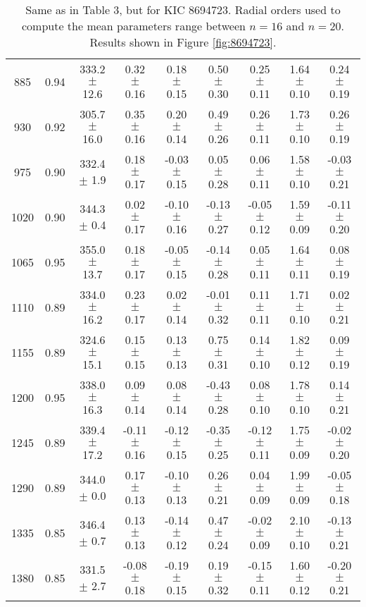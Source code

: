 \documentclass[twocolumn]{aastex61}%
\begin{document}
\begin{table*}[ht]
\begin{tabular}{ccc|ccccc|c}
885 & 0.94 & 333.2 $\pm$ 12.6 & 0.32 $\pm$ 0.16 & 0.18 $\pm$ 0.15 & 0.50 $\pm$ 0.30 & 0.25 $\pm$ 0.11 & 1.64 $\pm$ 0.10 & 0.24 $\pm$ 0.19\\
930 & 0.92 & 305.7 $\pm$ 16.0 & 0.35 $\pm$ 0.16 & 0.20 $\pm$ 0.14 & 0.49 $\pm$ 0.26 & 0.26 $\pm$ 0.11 & 1.73 $\pm$ 0.10 & 0.26 $\pm$ 0.19\\
975 & 0.90 & 332.4 $\pm$ 1.9 & 0.18 $\pm$ 0.17 & -0.03 $\pm$ 0.15 & 0.05 $\pm$ 0.28 & 0.06 $\pm$ 0.11 & 1.58 $\pm$ 0.10 & -0.03 $\pm$ 0.21\\
1020 & 0.90 & 344.3 $\pm$ 0.4 & 0.02 $\pm$ 0.17 & -0.10 $\pm$ 0.16 & -0.13 $\pm$ 0.27 & -0.05 $\pm$ 0.12 & 1.59 $\pm$ 0.09 & -0.11 $\pm$ 0.20\\
1065 & 0.95 & 355.0 $\pm$ 13.7 & 0.18 $\pm$ 0.17 & -0.05 $\pm$ 0.15 & -0.14 $\pm$ 0.28 & 0.05 $\pm$ 0.11 & 1.64 $\pm$ 0.11 & 0.08 $\pm$ 0.19\\
1110 & 0.89 & 334.0 $\pm$ 16.2 & 0.23 $\pm$ 0.17 & 0.02 $\pm$ 0.14 & -0.01 $\pm$ 0.32 & 0.11 $\pm$ 0.11 & 1.71 $\pm$ 0.10 & 0.02 $\pm$ 0.21\\
1155 & 0.89 & 324.6 $\pm$ 15.1 & 0.15 $\pm$ 0.15 & 0.13 $\pm$ 0.13 & 0.75 $\pm$ 0.31 & 0.14 $\pm$ 0.10 & 1.82 $\pm$ 0.12 & 0.09 $\pm$ 0.19\\
1200 & 0.95 & 338.0 $\pm$ 16.3 & 0.09 $\pm$ 0.14 & 0.08 $\pm$ 0.14 & -0.43 $\pm$ 0.28 & 0.08 $\pm$ 0.10 & 1.78 $\pm$ 0.10 & 0.14 $\pm$ 0.21\\
1245 & 0.89 & 339.4 $\pm$ 17.2 & -0.11 $\pm$ 0.16 & -0.12 $\pm$ 0.15 & -0.35 $\pm$ 0.25 & -0.12 $\pm$ 0.11 & 1.75 $\pm$ 0.09 & -0.02 $\pm$ 0.20\\
1290 & 0.89 & 344.0 $\pm$ 0.0 & 0.17 $\pm$ 0.13 & -0.10 $\pm$ 0.13 & 0.26 $\pm$ 0.21 & 0.04 $\pm$ 0.09 & 1.99 $\pm$ 0.09 & -0.05 $\pm$ 0.18\\
1335 & 0.85 & 346.4 $\pm$ 0.7 & 0.13 $\pm$ 0.13 & -0.14 $\pm$ 0.12 & 0.47 $\pm$ 0.24 & -0.02 $\pm$ 0.09 & 2.10 $\pm$ 0.10 & -0.13 $\pm$ 0.21\\
1380 & 0.85 & 331.5 $\pm$ 2.7 & -0.08 $\pm$ 0.18 & -0.19 $\pm$ 0.15 & 0.19 $\pm$ 0.32 & -0.15 $\pm$ 0.11 & 1.60 $\pm$ 0.12 & -0.20 $\pm$ 0.21\\
\end{tabular}
\caption{Same as in Table 3, but for KIC 8694723. Radial orders used to compute the mean parameters range between $n=16$ and $n=20$. Results shown in Figure \ref{fig:8694723}.}\label{tab:8694723}
\end{table*}
\end{document}
